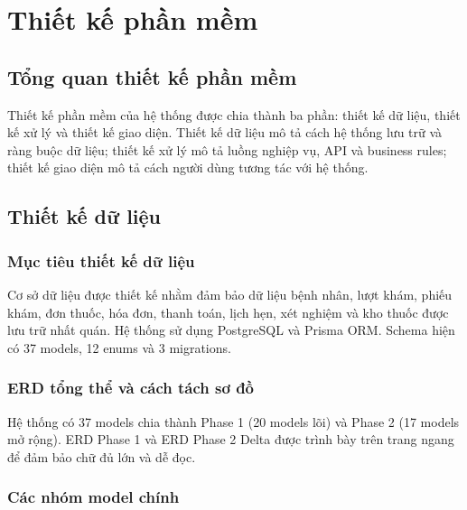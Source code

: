 \chapter{Thiết kế phần mềm}

\section{Tổng quan thiết kế phần mềm}

Thiết kế phần mềm của hệ thống được chia thành ba phần: thiết kế dữ liệu, thiết kế xử lý và thiết kế giao diện. Thiết kế dữ liệu mô tả cách hệ thống lưu trữ và ràng buộc dữ liệu; thiết kế xử lý mô tả luồng nghiệp vụ, API và business rules; thiết kế giao diện mô tả cách người dùng tương tác với hệ thống.

\section{Thiết kế dữ liệu}

\subsection{Mục tiêu thiết kế dữ liệu}

Cơ sở dữ liệu được thiết kế nhằm đảm bảo dữ liệu bệnh nhân, lượt khám, phiếu khám, đơn thuốc, hóa đơn, thanh toán, lịch hẹn, xét nghiệm và kho thuốc được lưu trữ nhất quán. Hệ thống sử dụng PostgreSQL và Prisma ORM. Schema hiện có 37 models, 12 enums và 3 migrations.

\subsection{ERD tổng thể và cách tách sơ đồ}

Hệ thống có 37 models chia thành Phase 1 (20 models lõi) và Phase 2 (17 models mở rộng). ERD Phase 1 và ERD Phase 2 Delta được trình bày trên trang ngang để đảm bảo chữ đủ lớn và dễ đọc.


\subsection{Các nhóm model chính}

